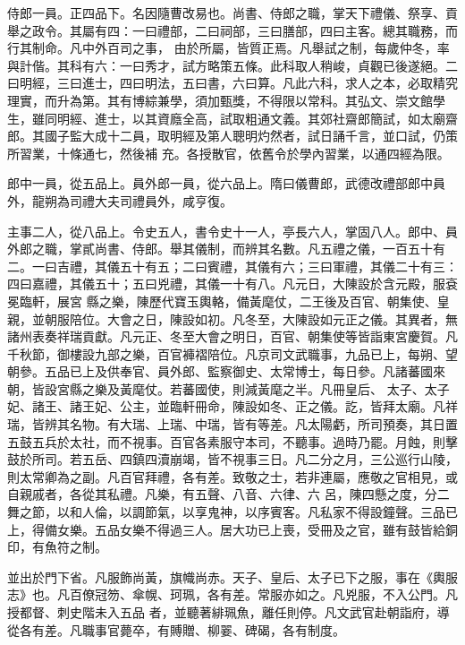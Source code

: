 \begin{pinyinscope}
 侍郎一員。正四品下。名因隨曹改易也。尚書、侍郎之職，掌天下禮儀、祭享、貢舉之政令。其屬有四：一曰禮部，二曰祠部，三曰膳部，四曰主客。總其職務，而行其制命。凡中外百司之事，
 由於所屬，皆質正焉。凡舉試之制，每歲仲冬，率與計偕。其科有六：一曰秀才，試方略策五條。此科取人稍峻，貞觀已後遂絕。二曰明經，三曰進士，四曰明法，五曰書，六曰算。凡此六科，求人之本，必取精究理實，而升為第。其有博綜兼學，須加甄獎，不得限以常科。其弘文、崇文館學生，雖同明經、進士，以其資廕全高，試取粗通文義。其郊社齋郎簡試，如太廟齋郎。其國子監大成十二員，取明經及第人聰明灼然者，試日誦千言，並口試，仍策所習業，十條通七，然後補
 充。各授散官，依舊令於學內習業，以通四經為限。



 郎中一員，從五品上。員外郎一員，從六品上。隋曰儀曹郎，武德改禮部郎中員外，龍朔為司禮大夫司禮員外，咸亨復。



 主事二人，從八品上。令史五人，書令史十一人，亭長六人，掌固八人。郎中、員外郎之職，掌貳尚書、侍郎。舉其儀制，而辨其名數。凡五禮之儀，一百五十有二。一曰吉禮，其儀五十有五；二曰賓禮，其儀有六；三曰軍禮，其儀二十有三：四曰嘉禮，其儀五十；五曰兇禮，其儀一十有八。凡元日，大陳設於含元殿，服袞冕臨軒，展宮
 縣之樂，陳歷代寶玉輿輅，備黃麾仗，二王後及百官、朝集使、皇親，並朝服陪位。大會之日，陳設如初。凡冬至，大陳設如元正之儀。其異者，無諸州表奏祥瑞貢獻。凡元正、冬至大會之明日，百官、朝集使等皆詣東宮慶賀。凡千秋節，御樓設九部之樂，百官褲褶陪位。凡京司文武職事，九品已上，每朔、望朝參。五品已上及供奉官、員外郎、監察御史、太常博士，每日參。凡諸蕃國來朝，皆設宮縣之樂及黃麾仗。若蕃國使，則減黃麾之半。凡冊皇后、
 太子、太子妃、諸王、諸王妃、公主，並臨軒冊命，陳設如冬、正之儀。訖，皆拜太廟。凡祥瑞，皆辨其名物。有大瑞、上瑞、中瑞，皆有等差。凡太陽虧，所司預奏，其日置五鼓五兵於太社，而不視事。百官各素服守本司，不聽事。過時乃罷。月蝕，則擊鼓於所司。若五岳、四鎮四瀆崩竭，皆不視事三日。凡二分之月，三公巡行山陵，則太常卿為之副。凡百官拜禮，各有差。致敬之士，若非連屬，應敬之官相見，或自親戚者，各從其私禮。凡樂，有五聲、八音、六律、六
 呂，陳四懸之度，分二舞之節，以和人倫，以調節氣，以享鬼神，以序賓客。凡私家不得設鐘聲。三品已上，得備女樂。五品女樂不得過三人。居大功已上喪，受冊及之官，雖有鼓皆給銅印，有魚符之制。



 並出於門下省。凡服飾尚黃，旗幟尚赤。天子、皇后、太子已下之服，事在《輿服志》也。凡百僚冠笏、傘幌、珂珮，各有差。常服亦如之。凡兇服，不入公門。凡授都督、刺史階未入五品
 者，並聽著緋珮魚，離任則停。凡文武官赴朝詣府，導從各有差。凡職事官薨卒，有賻贈、柳翣、碑碣，各有制度。




\end{pinyinscope}
